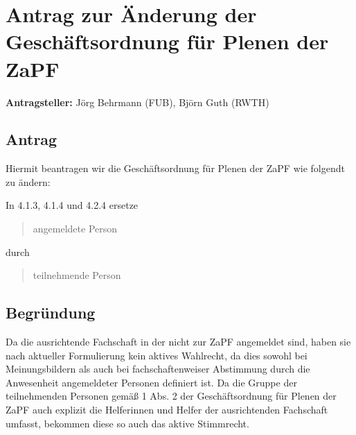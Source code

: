 \documentclass[draft,10pt,oneside]{scrartcl}
\begin{document}
\section*{Antrag zur Änderung der Geschäftsordnung für Plenen der ZaPF}

\textbf{Antragsteller:} Jörg Behrmann (FUB), Björn Guth (RWTH)

\subsection*{Antrag}

Hiermit beantragen wir die Geschäftsordnung für Plenen der ZaPF wie folgendt zu
ändern:

In 4.1.3, 4.1.4 und 4.2.4 ersetze
\begin{quote}
	angemeldete Person
\end{quote}
durch
\begin{quote}
	teilnehmende Person
\end{quote}

\subsection*{Begründung}
Da die ausrichtende Fachschaft in der nicht zur ZaPF angemeldet sind, haben sie
nach aktueller Formulierung kein aktives Wahlrecht, da dies sowohl bei
Meinungsbildern als auch bei fachschaftenweiser Abstimmung durch die
Anwesenheit angemeldeter Personen definiert ist. Da die Gruppe der
teilnehmenden Personen gemäß 1 Abs. 2 der Geschäftsordnung für Plenen der ZaPF
auch explizit die Helferinnen und Helfer der ausrichtenden Fachschaft umfasst,
bekommen diese so auch das aktive Stimmrecht.
\end{document}
